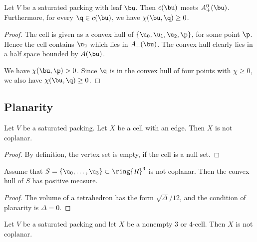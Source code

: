 \begin{lemma}  Let $V$ be a saturated packing with leaf $\bu$.
Then $c(\bu)$ meets $A_+^0(\bu)$.
Furthermore, for every $\q\in c(\bu)$, we have $\chi(\bu,\q)\ge0$.
\end{lemma}

\begin{proof} The cell is given as a convex hull of $\{\u_0,\u_1,\u_2,\p\}$, for some point $\p$.
Hence the cell contains $\u_2$ which lies in $A_+(\bu)$.   The convex hull clearly lies in a half
space bounded by $A(\bu)$.

We have $\chi(\bu,\p)>0$.  Since $\q$ is in the convex hull of four points with
$\chi\ge0$, we also have $\chi(\bu,\q)\ge0$.
\end{proof}


\subsection{Planarity}

\begin{lemma}\label{lemma:em2}  Let $V$ be a saturated packing. 
Let $X$ be a cell with an edge.  Then $X$ is not coplanar.
\end{lemma}

\begin{proof}
By definition, the vertex set is empty, if the  cell is a null set.
\end{proof}

\begin{lemma} Assume that $S=\{\u_0,\ldots,\u_3\}\subset\ring{R}^3$ is not coplanar.  Then
the convex hull of $S$ has positive measure.
\end{lemma}

\begin{proof} The volume of a tetrahedron has the form $\sqrt{\Delta}/12$, and the condition
of planarity is $\Delta=0$.
\end{proof}

\begin{lemma}\label{lemma:em34} 
Let $V$ be a saturated packing and let $X$ be a nonempty $3$ or $4$-cell.  Then
$X$ is not coplanar.
\end{lemma}

